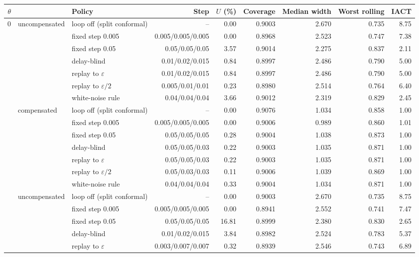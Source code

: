 \begin{tabular}{@{}rllrrrrrr@{}}
\toprule
$\theta$ & & Policy & Step & $U$ (\%) & Coverage & Median width & Worst rolling & IACT \\
\midrule
0 & uncompensated & loop off (split conformal) & -- & 0.00 & 0.9003 & 2.670 & 0.735 & 8.75 \\
 &  & fixed step 0.005 & 0.005/0.005/0.005 & 0.00 & 0.8968 & 2.523 & 0.747 & 7.38 \\
 &  & fixed step 0.05 & 0.05/0.05/0.05 & 3.57 & 0.9014 & 2.275 & 0.837 & 2.11 \\
 &  & delay-blind & 0.01/0.02/0.015 & 0.84 & 0.8997 & 2.486 & 0.790 & 5.00 \\
 &  & replay to $\varepsilon$ & 0.01/0.02/0.015 & 0.84 & 0.8997 & 2.486 & 0.790 & 5.00 \\
 &  & replay to $\varepsilon/2$ & 0.005/0.01/0.01 & 0.23 & 0.8980 & 2.514 & 0.764 & 6.40 \\
 &  & white-noise rule & 0.04/0.04/0.04 & 3.66 & 0.9012 & 2.319 & 0.829 & 2.45 \\
 & compensated & loop off (split conformal) & -- & 0.00 & 0.9076 & 1.034 & 0.858 & 1.00 \\
 &  & fixed step 0.005 & 0.005/0.005/0.005 & 0.00 & 0.9006 & 0.989 & 0.860 & 1.01 \\
 &  & fixed step 0.05 & 0.05/0.05/0.05 & 0.28 & 0.9004 & 1.038 & 0.873 & 1.00 \\
 &  & delay-blind & 0.05/0.05/0.03 & 0.22 & 0.9003 & 1.035 & 0.871 & 1.00 \\
 &  & replay to $\varepsilon$ & 0.05/0.05/0.03 & 0.22 & 0.9003 & 1.035 & 0.871 & 1.00 \\
 &  & replay to $\varepsilon/2$ & 0.05/0.03/0.03 & 0.11 & 0.9006 & 1.039 & 0.869 & 1.00 \\
 &  & white-noise rule & 0.04/0.04/0.04 & 0.33 & 0.9004 & 1.034 & 0.871 & 1.00 \\
\addlinespace
2 & uncompensated & loop off (split conformal) & -- & 0.00 & 0.9003 & 2.670 & 0.735 & 8.75 \\
 &  & fixed step 0.005 & 0.005/0.005/0.005 & 0.00 & 0.8941 & 2.552 & 0.741 & 7.47 \\
 &  & fixed step 0.05 & 0.05/0.05/0.05 & 16.81 & 0.8999 & 2.380 & 0.830 & 2.65 \\
 &  & delay-blind & 0.01/0.02/0.015 & 3.84 & 0.8982 & 2.524 & 0.783 & 5.37 \\
 &  & replay to $\varepsilon$ & 0.003/0.007/0.007 & 0.32 & 0.8939 & 2.546 & 0.743 & 6.89 \\

\end{tabular}
